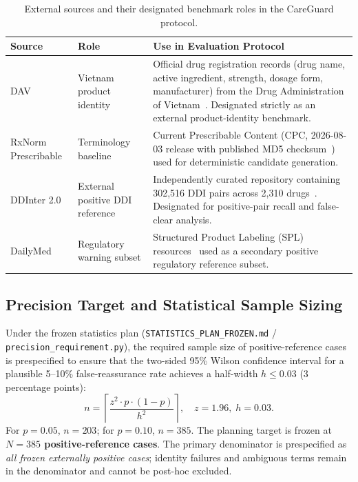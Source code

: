 \documentclass[11pt]{article}
\begin{document}
\begin{table}[H]
\centering
\caption{External sources and their designated benchmark roles in the CareGuard protocol.}
\label{tab:sources}
\small
\begin{tabularx}{\textwidth}{p{2.4cm}p{3.1cm}X}
\toprule
\textbf{Source} & \textbf{Role} & \textbf{Use in Evaluation Protocol} \\
\midrule
DAV & Vietnam product identity & Official drug registration records (drug name, active ingredient, strength, dosage form, manufacturer) from the Drug Administration of Vietnam~\cite{dav2026}. Designated strictly as an external product-identity benchmark. \\
RxNorm Prescribable & Terminology baseline & Current Prescribable Content (CPC, 2026-08-03 release with published MD5 checksum~\cite{nlmrxnorm2026}) used for deterministic candidate generation. \\
DDInter 2.0 & External positive DDI reference & Independently curated repository containing 302,516 DDI pairs across 2,310 drugs~\cite{tian2025ddinter,ddinterdownload2026}. Designated for positive-pair recall and false-clear analysis. \\
DailyMed & Regulatory warning subset & Structured Product Labeling (SPL) resources~\cite{dailymed2026} used as a secondary positive regulatory reference subset. \\
\bottomrule
\end{tabularx}
\end{table}

\subsection{Precision Target and Statistical Sample Sizing}
Under the frozen statistics plan (\texttt{STATISTICS\_PLAN\_FROZEN.md} / \texttt{precision\_requirement.py}), the required sample size of positive-reference cases is prespecified to ensure that the two-sided 95\% Wilson confidence interval for a plausible 5--10\% false-reassurance rate achieves a half-width $h \le 0.03$ (3 percentage points):
\begin{equation}
n = \left\lceil \frac{z^2 \cdot p \cdot (1-p)}{h^2} \right\rceil, \quad z = 1.96, \; h = 0.03.
\end{equation}
For $p = 0.05$, $n = 203$; for $p = 0.10$, $n = 385$. The planning target is frozen at \textbf{$N = 385$ positive-reference cases}. The primary denominator is prespecified as \emph{all frozen externally positive cases}; identity failures and ambiguous terms remain in the denominator and cannot be post-hoc excluded.
\end{document}
